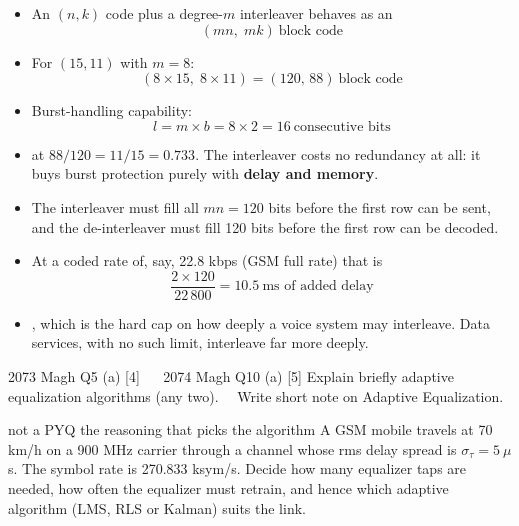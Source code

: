 \begin{itemize}
  \item An $(n,k)$ code plus a degree-$m$ interleaver behaves as an
        \[ (mn,\; mk)\ \text{block code} \]
  \item For $(15,11)$ with $m = 8$:
        \[ (8 \times 15,\; 8 \times 11) = \boxed{(120,\,88)\ \text{block code}} \]
  \item Burst-handling capability:
        \[ l = m \times b = 8 \times 2 = \boxed{16\ \text{consecutive bits}} \]
  \item {} at $88/120 = 11/15 = 0.733$. The interleaver costs no
        redundancy at all: it buys burst protection purely with \textbf{delay and memory}.
\end{itemize}

\begin{itemize}
  \item The interleaver must fill all $mn = 120$ bits before the first row can be sent, and the
        de-interleaver must fill 120 bits before the first row can be decoded.
  \item At a coded rate of, say, 22.8 kbps (GSM full rate) that is
        \[ \frac{2 \times 120}{22\,800} = 10.5\ \text{ms of added delay} \]
  \item {}, which is the hard cap on how deeply
        a voice system may interleave. Data services, with no such limit, interleave far more
        deeply.
\end{itemize}

\hr

{\color{sub}\footnotesize {}}

\begin{asked}{2073 Magh \textperiodcentered{} Q5 (a) \textperiodcentered{} [4]
\ \textperiodcentered{} \ 2074 Magh \textperiodcentered{} Q10 (a) \textperiodcentered{} [5]}
Explain briefly adaptive equalization algorithms (any two).
\ \textperiodcentered{}\ Write short note on Adaptive Equalization.
\end{asked}
\begin{asked}[PROBLEM]{not a PYQ \textperiodcentered{} the reasoning that picks the algorithm \added}
A GSM mobile travels at 70 km/h on a 900 MHz carrier through a channel whose rms delay spread is
$\sigma_\tau = 5\ \mu$s. The symbol rate is 270.833 ksym/s. Decide how many equalizer taps are
needed, how often the equalizer must retrain, and hence which adaptive algorithm (LMS, RLS or
Kalman) suits the link.
\end{asked}

